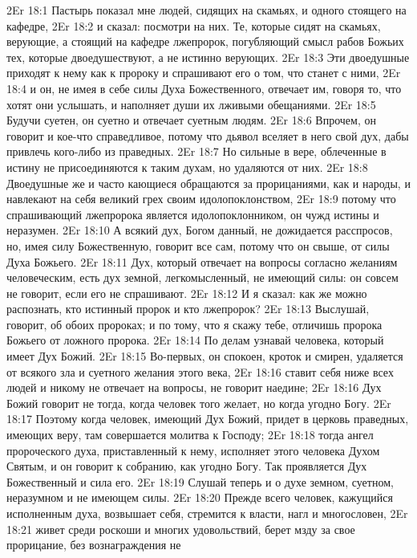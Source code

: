 \vs 2Er 18:1
Пастырь показал мне людей, сидящих на скамьях, и одного стоящего на кафедре,
\vs 2Er 18:2
и сказал: посмотри на них.
Те, которые сидят на скамьях, верующие, а стоящий на кафедре лжепророк,
погубляющий смысл рабов Божьих тех, которые двоедушествуют, а не истинно
верующих.
\vs 2Er 18:3
Эти двоедушные приходят к
нему как к пророку и спрашивают его о том, что станет с ними,
\vs 2Er 18:4
и он, не имея в себе силы
Духа Божественного, отвечает им, говоря то, что хотят они услышать, и
наполняет души их лживыми обещаниями.
\vs 2Er 18:5
Будучи суетен, он суетно и
отвечает суетным людям.
\vs 2Er 18:6
Впрочем, он говорит и
кое-что справедливое, потому что дьявол вселяет в него свой дух, дабы привлечь
кого-либо из праведных.
\vs 2Er 18:7
Но сильные в вере,
облеченные в истину не присоединяются к таким духам, но удаляются от них.
\vs 2Er 18:8
Двоедушные же и часто
кающиеся обращаются за прорицаниями, как и народы, и навлекают на себя великий
грех своим идолопоклонством,
\vs 2Er 18:9
потому что спрашивающий
лжепророка является идолопоклонником, он чужд истины и неразумен.
\vs 2Er 18:10
А всякий дух, Богом
данный, не дожидается расспросов, но, имея силу Божественную, говорит все сам,
потому что он свыше, от силы Духа Божьего.
\vs 2Er 18:11
Дух, который отвечает на
вопросы согласно желаниям человеческим, есть дух земной, легкомысленный, не
имеющий силы: он совсем не говорит, если его не спрашивают.
\vs 2Er 18:12
И я сказал: как же можно
распознать, кто истинный пророк и кто лжепророк?
\vs 2Er 18:13
Выслушай, говорит, об
обоих пророках; и по тому, что я скажу тебе, отличишь пророка Божьего от
ложного пророка.
\vs 2Er 18:14
По делам узнавай
человека, который имеет Дух Божий.
\vs 2Er 18:15
Во-первых, он спокоен,
кроток и смирен, удаляется от всякого зла и суетного желания этого века,
\vs 2Er 18:16
ставит себя ниже всех
людей и никому не отвечает на вопросы, не говорит наедине;
\vs 2Er 18:16
Дух Божий говорит не
тогда, когда человек того желает, но когда угодно Богу.
\vs 2Er 18:17
Поэтому когда человек,
имеющий Дух Божий, придет в церковь праведных, имеющих веру, там совершается
молитва к Господу;
\vs 2Er 18:18
тогда ангел пророческого
духа, приставленный к нему, исполняет этого человека Духом Святым, и он
говорит к собранию, как угодно Богу. Так проявляется Дух Божественный и сила
его.
\vs 2Er 18:19
Слушай теперь и о духе
земном, суетном, неразумном и не имеющем силы.
\vs 2Er 18:20
Прежде всего человек,
кажущийся исполненным духа, возвышает себя, стремится к власти, нагл и
многословен,
\vs 2Er 18:21
живет среди роскоши и
многих удовольствий, берет мзду за свое прорицание, без вознаграждения не
